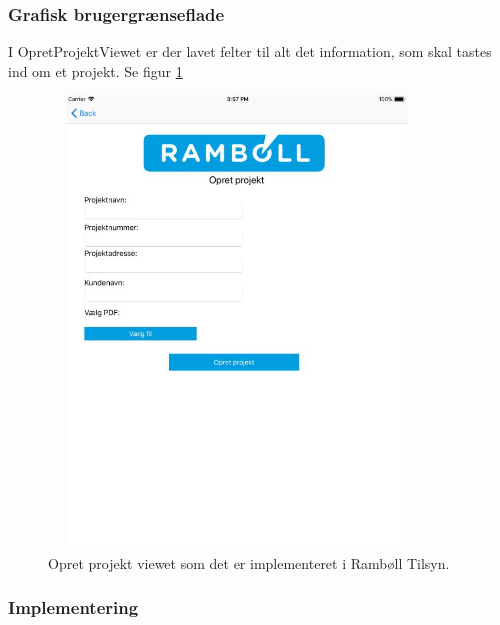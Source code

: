 \subsubsection{Grafisk brugergrænseflade}
I OpretProjektViewet er der lavet felter til alt det information, som skal tastes ind om et projekt. Se figur \ref{fig:OpretProjektView}
\begin{figure}[H] %
	\centering
	\includegraphics[height=12cm, width=10cm]{../ArkitekturDesign/Design/OpretProjekt/OpretProjektView}
	\caption{Opret projekt viewet som det er implementeret i Rambøll Tilsyn.}
	\label{fig:OpretProjektView}
\end{figure}

\subsubsection{Implementering}


\clearpage
